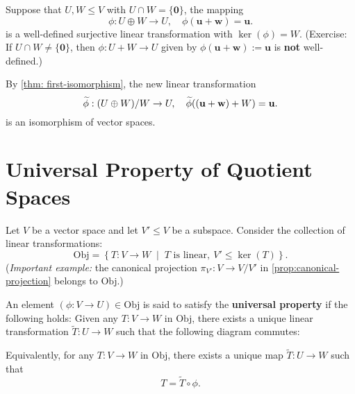 \begin{example}
Suppose that \( U, W \leq V \) with \( U \cap W = \{ \mathbf{0} \} \), the mapping
\[
\phi : U \oplus W \to U, \quad \phi(\mathbf{u} + \mathbf{w}) = \mathbf{u}.
\]
is a well-defined surjective linear transformation with \( \ker(\phi) = W \). 
\noindent (Exercise: If  \( U \cap W \neq \{ \mathbf{0} \} \), then 
\(\phi : U + W \to U\) given by \(\phi(\mathbf{u} + \mathbf{w}) := \mathbf{u}\) is \textbf{not} well-defined.)



By \autoref{thm: first-isomorphism}, the new linear transformation
\[
\widetilde{\phi} : (U \oplus W)/W \to U, \quad \widetilde{\phi}((\mathbf{u} + \mathbf{w}) + W) = {\bf u}.
\]
is an isomorphism of vector spaces.
\end{example}

\section{Universal Property of Quotient Spaces}
\begin{definition}\label{def:universal-property-quotient}
Let \( V \) be a vector space and let \( V' \leq V \) be a subspace. Consider the collection of linear transformations:
\[
\mathrm{Obj} = \left\{ T : V \to W \;\middle|\;
T \text{ is linear},\ V' \leq \ker(T)
\right\}.
\]
({\it Important example:} the canonical projection \( \pi_{V'} : V \to V/V' \) in \autoref{prop:canonical-projection} belongs to \( \mathrm{Obj} \).)

\medskip
An element \( (\phi : V \to U) \in\mathrm{Obj} \) is said to satisfy the \textbf{universal property} if the following holds: Given any \( T : V \to W \) in \( \mathrm{Obj} \), there exists a unique linear transformation \( \widetilde{T} : U \to W \) such that the following diagram commutes:

\begin{figure}[h!]
\centering
{}
\label{fig:universal-quotient}
\end{figure}
Equivalently, for any \( T : V \to W \) in \( \mathrm{Obj} \), there exists a unique map \( \widetilde{T} : U \to W \) such that
\[
T = \widetilde{T} \circ \phi.
\]
\end{definition}

